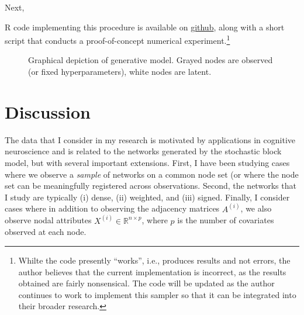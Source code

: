 \documentclass[11pt]{article}   %
\newcommand{\V}[1]{\ensuremath{\boldsymbol{#1}}}
\begin{document}
Next, 


R code implementing this procedure is available on \href{https://github.com/dankessler/608b-project}{github}, along with a short script that conducts a proof-of-concept numerical experiment.\footnote{Whilte the code presently ``works'', i.e., produces results and not errors, the author believes that the current implementation is incorrect, as the results obtained are fairly nonsensical. The code will be updated as the author continues to work to implement this sampler so that it can be integrated into their broader research.}


\begin{figure}[h]
  \centering
  \caption{Graphical depiction of generative model. Grayed nodes are observed (or fixed hyperparameters), white nodes are latent.}
  \label{fig:plate-overview}
\end{figure}

\section{Discussion}
\label{sec:discussion}



The data that I consider in my research  is motivated by applications in cognitive neuroscience and is related to the networks generated by the stochastic block model, but with several important extensions.
First, I have been studying cases where we observe a \emph{sample} of networks on a common node set (or where the node set can be meaningfully registered across observations.
Second, the networks that I study are typically (i) dense, (ii) weighted, and (iii) signed.
Finally, I consider cases where in addition to observing the adjacency matrices $A^{(i)}$, we also observe nodal attributes $X^{(i)} \in \mathbb{R}^{n \times p}$, where $p$ is the number of covariates observed at each node.
\end{document}
